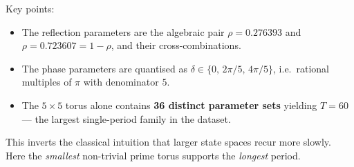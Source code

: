 \noindent Key points:
\begin{itemize}[nosep]
\item The reflection parameters are the algebraic pair
$\rho = 0.276393$ and $\rho = 0.723607 = 1 - \rho$, and their
cross-combinations.
\item The phase parameters are quantised as
$\delta \in \{0,\,2\pi/5,\,4\pi/5\}$, i.e.\ rational multiples of $\pi$
with denominator $5$.
\item The $5 \times 5$ torus alone contains \textbf{36 distinct
parameter sets} yielding $T=60$ --- the largest single-period family in
the dataset.
\end{itemize}

This inverts the classical intuition that larger state spaces recur
more slowly. Here the \emph{smallest} non-trivial prime torus supports
the \emph{longest} period.
